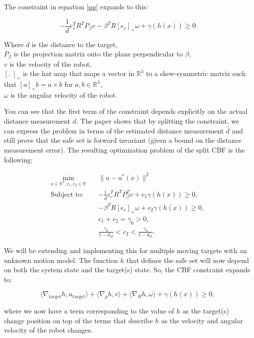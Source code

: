 \documentclass[letterpaper, 10 pt, conference]{ieeeconf}
\begin{document}
The constraint in equation \eqref{qp} expands to this:

\[
- \frac{1}{d} e_c^T R^T P_{\beta} v - \beta^T R [e_c]_\times \omega + \gamma(h(x)) \geq 0
\]

Where $d$ is the distance to the target, \\
$P_{\beta}$ is the projection matrix onto the plane perpendicular to $\beta$, \\
$v$ is the velocity of the robot, \\
$[. \ ]_\times$ is the hat map that maps a vector in $\mathbb{R}^3$ to a skew-symmetric matrix such that $[a]_\times b = a \times b$ for $a,b \in \mathbb{R}^3$, \\
$\omega$ is the angular velocity of the robot.

You can see that the first term of the constraint depends explicitly on the actual distance measurement $d$. The paper shows that by splitting the constraint, we can express the problem in terms of the estimated distance measurement $\hat{d}$ and still prove that the safe set is forward invariant (given a bound on the distance measurement error). The resulting optimization problem of the split CBF is the following:

\begin{align*}
\min_{u \in \mathbb{R}^3, c_1, c_2 \in \mathbb{R}} \quad & \| u - u^*(x) \|^2 \\
\text{Subject to:} \quad & -\frac{1}{\hat{d}} e_c^T R^T P_{\beta}^T v + c_1 \gamma(h(x)) \geq 0, \\
& -\beta^T R [e_c]_\times \omega + c_2 \gamma(h(x)) \geq 0, \\
& c_1 + c_2 = \gamma_0 > 0, \\
& \frac{\gamma_0}{1 - d_M} < c_2 < \frac{\gamma_0}{1 - d_m}.
\end{align*}

We will be extending and implementing this for multiple moving targets with an unknown motion model. The function $h$ that defines the safe set will now depend on both the system state and the target(s) state. So, the CBF constraint expands to:

\[
\langle \nabla_{\text{target}} h, u_{\text{target}} \rangle + \langle \nabla_p h, v \rangle + \langle \nabla_R h, \omega \rangle + \gamma(h(x)) \geq 0,
\]

where we now have a term corresponding to the value of $h$ as the target(s) change position on top of the terms that describe $h$ as the velocity and angular velocity of the robot changes.
\end{document}
